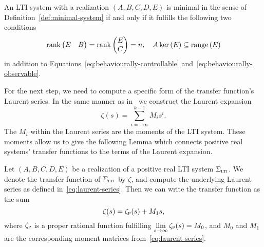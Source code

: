 \begin{lemma}\label{lem:minimality-conditions}
    An \ac{LTI} system with a realization $(A, B, C, D, E)$ is minimal in the sense of Definition~\ref{def:minimal-system} if and only if it fulfills the following two conditions
    \begin{equation*}
        \mathop{}\!\mathrm{rank}\left(\begin{matrix}
            E & B
        \end{matrix}\right) = \mathop{}\!\mathrm{rank}\left(\begin{matrix}
            E \\
            C
        \end{matrix}\right) = n,\quad A \mathop{}\!\mathrm{ker}\left(E\right) \subseteq \mathop{}\!\mathrm{range}\left(E\right)
    \end{equation*}
    in addition to Equations~\eqref{eq:behaviourally-controllable} and~\eqref{eq:behaviourally-observable}.
\end{lemma}

For the next step, we need to compute a specific form of the transfer function's Laurent series.
In the same manner as in~\cite[Section~5]{CGH2022} we construct the Laurent expansion
\begin{equation}\label{eq:laurent-series}
    \zeta(s) = \sum\limits_{i = -\infty}^{k - 1} M_i s^i.
\end{equation}
The $M_i$ within the Laurent series are the moments of the \ac{LTI} system.
These moments allow us to give the following Lemma which connects positive real systems' transfer functions to the terms of the Laurent expansion.

\begin{lemma}\label{lem:lti-laurent-series}
    Let $(A, B, C, D, E)$ be a realization of a positive real \ac{LTI} system $\Sigma_{\textnormal{\scshape lti}}$.
    We denote the transfer function of $\Sigma_{\textnormal{\scshape lti}}$ by $\zeta$, and compute the underlying Laurent series as defined in~\eqref{eq:laurent-series}.
    Then we can write the transfer function as the sum
    \begin{equation}\label{eq:pr-lti-laurent-series}
        \zeta(s) = \zeta_{\textnormal{\scshape p}}(s) + M_1 s,
    \end{equation}
    where $\zeta_{\textnormal{\scshape p}}$ is a proper rational function fulfilling $\lim\limits_{s \to \infty} \zeta_{\textnormal{\scshape p}}(s) = M_0$, and $M_0$ and $M_1$ are the corresponding moment matrices from~\eqref{eq:laurent-series}.
\end{lemma}

